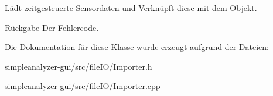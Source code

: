 Lädt zeitgesteuerte Sensordaten und Verknüpft diese mit dem Objekt. \begin{DoxyReturn}{Rückgabe}
Der Fehlercode. 
\end{DoxyReturn}


Die Dokumentation für diese Klasse wurde erzeugt aufgrund der Dateien\-:\begin{DoxyCompactItemize}
\item 
simpleanalyzer-\/gui/src/file\-I\-O/Importer.\-h\item 
simpleanalyzer-\/gui/src/file\-I\-O/Importer.\-cpp\end{DoxyCompactItemize}
